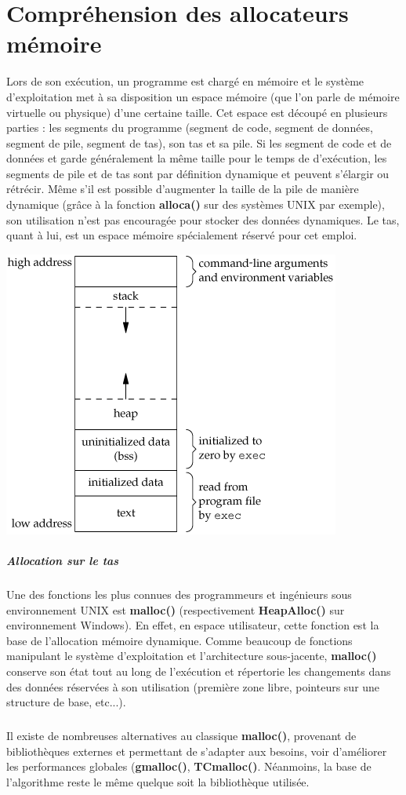 \section{Compréhension des allocateurs mémoire}
Lors de son exécution, un programme est chargé en mémoire et le système d'exploitation
met à sa disposition un espace mémoire (que l'on parle de mémoire virtuelle ou physique)
d'une certaine taille. Cet espace est découpé en plusieurs parties : les segments du programme
(segment de code, segment de données, segment de pile, segment de tas), son tas et sa pile. Si les segment de code et de
données et garde généralement la même taille pour le temps de d'exécution, les segments de pile et de tas sont par définition
dynamique et peuvent s'élargir ou rétrécir. Même s'il est possible d'augmenter la taille de la pile de manière dynamique (grâce
à la fonction \textbf{alloca()} sur des systèmes UNIX par exemple), son utilisation n'est pas encouragée pour stocker des données
dynamiques. Le tas, quant à lui, est un espace mémoire spécialement réservé pour cet emploi.
\begin{center}
\includegraphics[scale=0.4]{memory-layout.png}\newline
\end{center}


\subparagraph{Allocation sur le tas}
Une des fonctions les plus connues des programmeurs et ingénieurs sous environnement UNIX est \textbf{malloc()} (respectivement \textbf{HeapAlloc()} sur
environnement Windows). En effet, en espace utilisateur, cette fonction est la base de l'allocation mémoire dynamique. Comme beaucoup de fonctions
manipulant le système d'exploitation et l'architecture sous-jacente, \textbf{malloc()} conserve son état tout au long de l'exécution et répertorie les
changements dans des données réservées à son utilisation (première zone libre, pointeurs sur une structure de base, etc...).
\subparagraph{}
Il existe de nombreuses alternatives au classique \textbf{malloc()}, provenant de bibliothèques externes et permettant de s'adapter aux besoins, voir d'améliorer les
performances globales (\textbf{gmalloc()}, \textbf{TCmalloc()}. Néanmoins, la base de l'algorithme reste le même quelque soit la bibliothèque utilisée.

